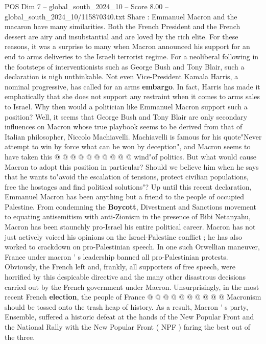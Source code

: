 \begin{textsample}{POS Dim 7 – global\_south\_2024\_10 – Score 8.00 – global\_south\_2024\_10/115870340.txt}  \label{ex:f7_pos_226}
Share : Emmanuel Macron and the macaron have many similarities.
Both the French President and the French dessert are airy and insubstantial and are loved by the rich elite.
For these reasons, it was a surprise to many when Macron announced his support for an end to arms deliveries to the Israeli terrorist regime.
For a neoliberal following in the footsteps of interventionists such as George Bush and Tony Blair, such a declaration is nigh unthinkable.
Not even Vice-President Kamala Harris, a nominal progressive, has called for an arms \textbf{embargo}.
In fact, Harris has made it emphatically that she does not support any restraint when it comes to arms sales to Israel.
Why then would a politician like Emmanuel Macron support such a position?
Well, it seems that George Bush and Tony Blair are only secondary influences on Macron whose true playbook seems to be derived from that of Italian philosopher, Niccolo Machiavelli.
Machiavelli is famous for his quote"Never attempt to win by force what can be won by deception", and Macron seems to have taken this @ @ @ @ @ @ @ @ @ @ wind"of politics.
But what would cause Macron to adopt this position in particular?
Should we believe him when he says that he wants to"avoid the escalation of tensions, protect civilian populations, free the hostages and find political solutions"?
Up until this recent declaration, Emmanuel Macron has been anything but a friend to the people of occupied Palestine.
From condemning the \textbf{Boycott}, Divestment and Sanctions movement to equating antisemitism with anti-Zionism in the presence of Bibi Netanyahu, Macron has been staunchly pro-Israel his entire political career.
Macron has not just actively voiced his opinions on the Israel-Palestine conflict ; he has also worked to crackdown on pro-Palestinian speech.
In one such Orwellian maneuver, France under macron ' s leadership banned all pro-Palestinian protests.
Obviously, the French left and, frankly, all supporters of free speech, were horrified by this despicable directive and the many other disastrous decisions carried out by the French government under Macron.
Unsurprisingly, in the most recent French \textbf{election}, the people of France @ @ @ @ @ @ @ @ @ @ Macronism should be tossed onto the trash heap of history.
As a result, Macron ' s party, Ensemble, suffered a historic defeat at the hands of the New Popular Front and the National Rally with the New Popular Front ( NPF ) faring the best out of the three.

\end{textsample}
